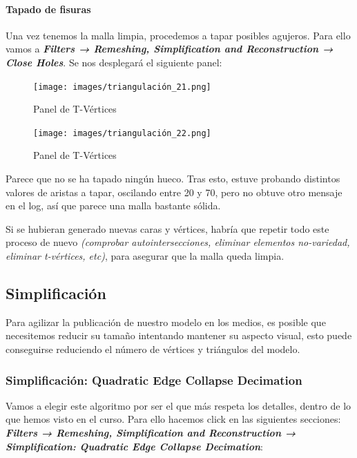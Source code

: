 \documentclass[options]{article}
\begin{document}
\paragraph{Tapado de fisuras}

Una vez tenemos la malla limpia, procedemos a tapar posibles agujeros. Para ello vamos a \textbf{\textit{Filters → Remeshing, Simplification and Reconstruction → Close Holes}}. Se nos desplegará el siguiente panel:

\begin{figure}[H]
    \centering
    \texttt{[image: images/triangulación\_21.png]}
    \caption{Panel de T-Vértices}
\end{figure}

\begin{figure}[H]
    \centering
    \texttt{[image: images/triangulación\_22.png]}
    \caption{Panel de T-Vértices}
\end{figure}

Parece que no se ha tapado ningún hueco. Tras esto, estuve probando distintos valores de aristas a tapar, oscilando entre 20 y 70, pero no obtuve otro mensaje en el log, así que parece una malla bastante sólida.

Si se hubieran generado nuevas caras y vértices, habría que repetir todo este proceso de nuevo \textit{(comprobar autointersecciones, eliminar elementos no-variedad, eliminar t-vértices, etc)}, para asegurar que la malla queda limpia.

\subsection{Simplificación}

Para agilizar la publicación de nuestro modelo en los medios, es posible que necesitemos reducir su tamaño intentando mantener su aspecto visual, esto puede conseguirse reduciendo el número de vértices y triángulos del modelo.

\subsubsection{Simplificación: Quadratic Edge Collapse Decimation}

Vamos a elegir este algoritmo por ser el que más respeta los detalles, dentro de lo que hemos visto en el curso. Para ello hacemos click en las siguientes secciones: \textbf{\textit{Filters → Remeshing, Simplification and Reconstruction → Simplification: Quadratic Edge Collapse Decimation}}:
\end{document}

